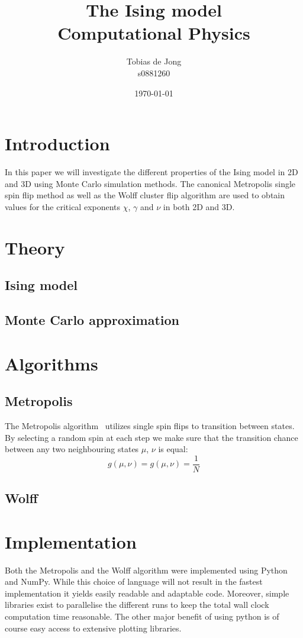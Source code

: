 \documentclass[11pt,twocolumn]{article}
\begin{document}
\title{The Ising model\\ Computational Physics}
\author{Tobias de Jong\\ s0881260}
\date{\today} %

\maketitle
\newcommand{\Part}[3][ ]{\ensuremath{\frac{\partial^{#1} #2}{{\partial #3}^{#1}}}}
\newcommand{\Dif}[3][ ]{\ensuremath{\frac{d^{#1} #2}{{d #3}^{#1}}}}
\renewcommand{\O}[1]{\ensuremath{\mathcal{O}\left(#1\right)}}
\renewcommand{\vec}{\bold}
\section{Introduction}
In this paper we will investigate the different properties of the Ising model in 2D and 3D using Monte Carlo simulation methods. The canonical Metropolis single spin flip method as well as the Wolff cluster flip algorithm are used to obtain values for the critical exponents $\chi$, $\gamma$ and $\nu$ in both 2D and 3D. %
\section{Theory}
\subsection{Ising model}
\subsection{Monte Carlo approximation}
\section{Algorithms}
\subsection{Metropolis}
The Metropolis algorithm~\cite{Metropolis} utilizes single spin flips to transition between states. By selecting a random spin at each step we make sure that the transition chance  between any two neighbouring states $\mu$, $\nu$ is equal:
\[g(\mu,\nu) = g(\mu,\nu) = \frac1N\]
\subsection{Wolff}
\section{Implementation}
Both the Metropolis and the Wolff algorithm were implemented using Python and NumPy. While this choice of language will not result in the fastest implementation it yields easily readable and adaptable code. 
Moreover, simple libraries exist to parallelise the different runs to keep the total wall clock computation time reasonable.
The other major benefit of using python is of course easy access to extensive plotting libraries.
\end{document}
